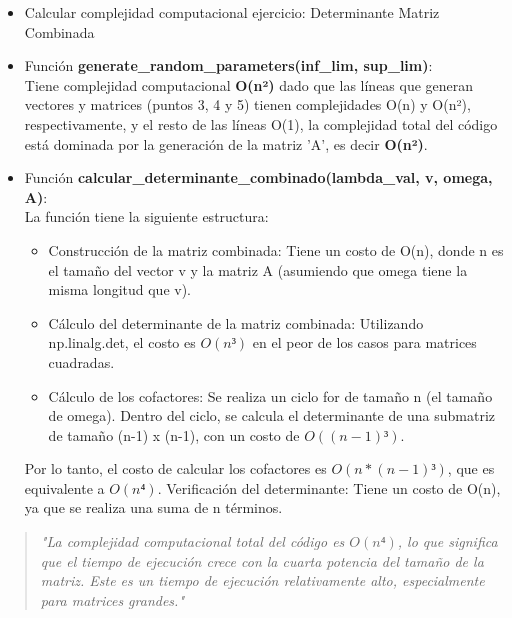 \documentclass[11pt]{article}
\providecommand{\tightlist}{%
      \setlength{\itemsep}{0pt}\setlength{\parskip}{0pt}}
\begin{document}
    \begin{itemize}
\item
  Calcular complejidad computacional ejercicio: Determinante Matriz
  Combinada
\item
  Función \textbf{generate\_random\_parameters(inf\_lim, sup\_lim)}:\\
  Tiene complejidad computacional \textbf{O(n²)} dado que las líneas que
  generan vectores y matrices (puntos 3, 4 y 5) tienen complejidades
  O(n) y O(n²), respectivamente, y el resto de las líneas O(1), la
  complejidad total del código está dominada por la generación de la
  matriz 'A', es decir \textbf{O(n²)}.
\item
  Función \textbf{calcular\_determinante\_combinado(lambda\_val, v,
  omega, A)}:\\
  La función tiene la siguiente estructura:

  \begin{itemize}
  \tightlist
  \item
    Construcción de la matriz combinada: Tiene un costo de O(n), donde n
    es el tamaño del vector v y la matriz A (asumiendo que omega tiene
    la misma longitud que v).
  \item
    Cálculo del determinante de la matriz combinada: Utilizando
    np.linalg.det, el costo es \(O(n³)\) en el peor de los casos para
    matrices cuadradas.
  \item
    Cálculo de los cofactores: Se realiza un ciclo for de tamaño n (el
    tamaño de omega). Dentro del ciclo, se calcula el determinante de
    una submatriz de tamaño (n-1) x (n-1), con un costo de
    \(O((n-1)³)\).
  \end{itemize}

  Por lo tanto, el costo de calcular los cofactores es
  \(O(n * (n-1)³)\), que es equivalente a \(O(n⁴)\). Verificación del
  determinante: Tiene un costo de O(n), ya que se realiza una suma de n
  términos.
\end{itemize}

\begin{quote}
\emph{"La complejidad computacional total del código es \(O(n⁴)\), lo
que significa que el tiempo de ejecución crece con la cuarta potencia
del tamaño de la matriz. Este es un tiempo de ejecución relativamente
alto, especialmente para matrices grandes."}
\end{quote}
\end{document}
